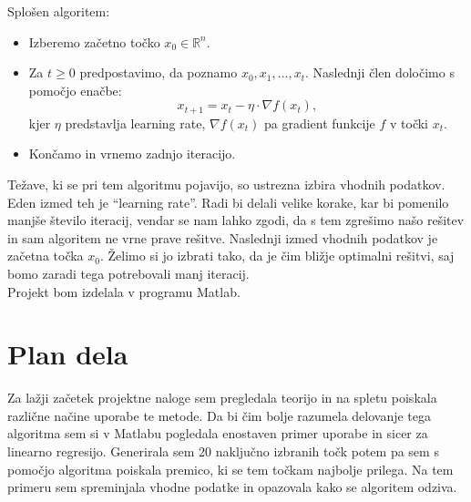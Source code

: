\documentclass{article}
\begin{document}
Splošen algoritem:
\begin{itemize}
\item{Izberemo začetno točko $x_0 \in \mathbb{R}^n $. }
\item{Za $t \geq 0$ predpostavimo, da poznamo $x_0,x_1, \ldots ,x_t $. Naslednji člen določimo s pomočjo enačbe: 
\[ x_{t+1}=x_t - \eta \cdot \nabla f(x_t), \] 
kjer $ \eta$ predstavlja learning rate, $\nabla f(x_t) $ pa gradient funkcije $f$ v točki $x_t$.}
\item{Končamo in vrnemo zadnjo iteracijo.}
\end{itemize}

Težave, ki se pri tem algoritmu pojavijo, so ustrezna izbira vhodnih podatkov. Eden izmed teh je ``learning rate''. Radi bi delali velike korake, kar bi pomenilo manjše število iteracij, vendar se nam lahko zgodi, da s tem zgrešimo našo rešitev in sam algoritem ne vrne prave rešitve. Naslednji izmed vhodnih podatkov je začetna točka $x_0$. Želimo si jo izbrati tako, da je čim bližje optimalni rešitvi, saj bomo zaradi tega potrebovali manj iteracij.\\

Projekt bom izdelala v programu Matlab.

\section{Plan dela}
Za lažji začetek projektne naloge sem pregledala teorijo in na spletu poiskala različne načine uporabe te metode. Da bi čim bolje razumela delovanje tega algoritma sem si v Matlabu pogledala enostaven primer uporabe in sicer za linearno regresijo. Generirala sem 20 naključno izbranih točk potem pa sem s pomočjo algoritma poiskala premico, ki se tem točkam najbolje prilega. Na tem primeru sem spreminjala vhodne podatke in opazovala kako se algoritem odziva.\\
\end{document}
